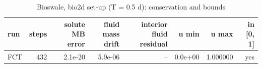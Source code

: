 \begin{table}[h]
\centering
\caption{Bioswale, bio2d set-up (T = 0.5 d): conservation and bounds}
\begin{tabular}{lrrrrrrr}
\hline
run & steps & solute MB error & fluid mass drift & interior fluid residual & u min & u max & in [0, 1] \\
\hline
FCT & 432 & 2.1e-20 & 5.9e-06 & -- & 0.0e+00 & 1.000000 & yes \\
\hline
\end{tabular}
\end{table}
